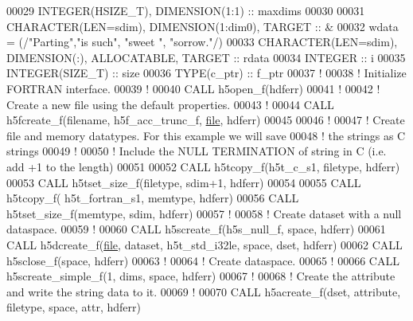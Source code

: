 \begin{DoxyCode}
00029   \textcolor{keywordtype}{INTEGER(HSIZE\_T)}, \textcolor{keywordtype}{DIMENSION(1:1)} :: maxdims
00030   
00031   \textcolor{keywordtype}{CHARACTER(LEN=sdim)}, \textcolor{keywordtype}{DIMENSION(1:dim0)}, \textcolor{keywordtype}{TARGET} :: &
00032        wdata = (/\textcolor{stringliteral}{"Parting"},\textcolor{stringliteral}{"is such"}, \textcolor{stringliteral}{"sweet  "}, \textcolor{stringliteral}{"sorrow."}/)
00033   \textcolor{keywordtype}{CHARACTER(LEN=sdim)}, \textcolor{keywordtype}{DIMENSION(:)}, \textcolor{keywordtype}{ALLOCATABLE}, \textcolor{keywordtype}{TARGET} :: rdata
00034   \textcolor{keywordtype}{INTEGER} :: i
00035   \textcolor{keywordtype}{INTEGER(SIZE\_T)} :: size
00036   \textcolor{keywordtype}{TYPE}(c\_ptr) :: f\_ptr
00037   \textcolor{comment}{!}
00038   \textcolor{comment}{! Initialize FORTRAN interface.}
00039   \textcolor{comment}{!}
00040   \textcolor{keyword}{CALL }h5open\_f(hdferr)
00041   \textcolor{comment}{!}
00042   \textcolor{comment}{! Create a new file using the default properties.}
00043   \textcolor{comment}{!}
00044   \textcolor{keyword}{CALL }h5fcreate\_f(filename, h5f\_acc\_trunc\_f, \hyperlink{structfile}{file}, hdferr)
00045 
00046   \textcolor{comment}{!}
00047   \textcolor{comment}{! Create file and memory datatypes.  For this example we will save}
00048   \textcolor{comment}{! the strings as C strings}
00049   \textcolor{comment}{!}
00050   \textcolor{comment}{! Include the NULL TERMINATION of string in C (i.e. add +1 to the length)}
00051 
00052   \textcolor{keyword}{CALL }h5tcopy\_f(h5t\_c\_s1, filetype, hdferr)
00053   \textcolor{keyword}{CALL }h5tset\_size\_f(filetype, sdim+1, hdferr)
00054 
00055   \textcolor{keyword}{CALL }h5tcopy\_f( h5t\_fortran\_s1, memtype, hdferr)
00056   \textcolor{keyword}{CALL }h5tset\_size\_f(memtype, sdim, hdferr)
00057   \textcolor{comment}{!}
00058   \textcolor{comment}{! Create dataset with a null dataspace.}
00059   \textcolor{comment}{!}
00060   \textcolor{keyword}{CALL }h5screate\_f(h5s\_null\_f, space, hdferr)
00061   \textcolor{keyword}{CALL }h5dcreate\_f(\hyperlink{structfile}{file}, dataset, h5t\_std\_i32le, space, dset, hdferr)
00062   \textcolor{keyword}{CALL }h5sclose\_f(space, hdferr)
00063   \textcolor{comment}{!}
00064   \textcolor{comment}{! Create dataspace.}
00065   \textcolor{comment}{!}
00066   \textcolor{keyword}{CALL }h5screate\_simple\_f(1, dims, space, hdferr)
00067   \textcolor{comment}{!}
00068   \textcolor{comment}{! Create the attribute and write the string data to it.}
00069   \textcolor{comment}{!}
00070   \textcolor{keyword}{CALL }h5acreate\_f(dset, attribute, filetype, space, attr, hdferr)

\end{DoxyCode}
